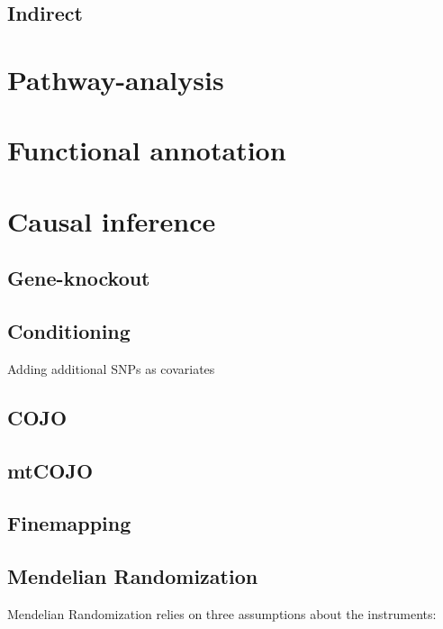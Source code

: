 \documentclass[]{book}
\theoremstyle{definition}
\theoremstyle{definition}
\theoremstyle{definition}
\theoremstyle{remark}
\begin{document}
\section{Indirect}\label{indirect}

\chapter{Pathway-analysis}\label{pathway-analysis}

\chapter{Functional annotation}\label{functional-annotation}

\chapter{Causal inference}\label{causal-inference}

\section{Gene-knockout}\label{gene-knockout}

\section{Conditioning}\label{conditioning}

Adding additional SNPs as covariates

\section{COJO}\label{cojo}

\section{mtCOJO}\label{mtcojo}

\section{Finemapping}\label{finemapping}

\section{Mendelian Randomization}\label{mendelian-randomization}

Mendelian Randomization relies on three assumptions about the
instruments:
\end{document}
